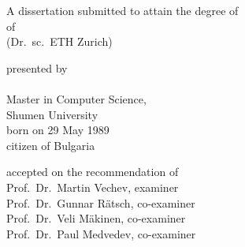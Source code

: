 \begin{titlepage}
    \begin{center}
        \large
        \begingroup
        \endgroup

        \hfill

        \vfill

        \begingroup
            \spacedallcaps{\myTitle}
        \endgroup

        \vfill

        \begingroup
            A dissertation submitted to attain the degree of\\
            \vspace{0.5em}
            of
             \\
            (Dr.\ sc.\ ETH Zurich)
        \endgroup

        \vfill

        \begingroup
            presented by\\
            \vspace{0.5em}
            \spacedlowsmallcaps{\myName}\\
            Master in Computer Science,\\
            Shumen University \\
            \vspace{0.5em}
            born on 29 May 1989\\
            citizen of Bulgaria
        \endgroup

        \vfill

        \begingroup
            accepted on the recommendation of\\
            \vspace{0.5em}
            Prof.\ Dr.\ Martin Vechev, examiner\\ 
            Prof.\ Dr.\ Gunnar Rätsch, co-examiner\\
            Prof.\ Dr.\ Veli Mäkinen, co-examiner\\
            Prof.\ Dr.\ Paul Medvedev, co-examiner
        \endgroup

        \vfill

        \myTime%

        \vfill
    \end{center}
\end{titlepage}
